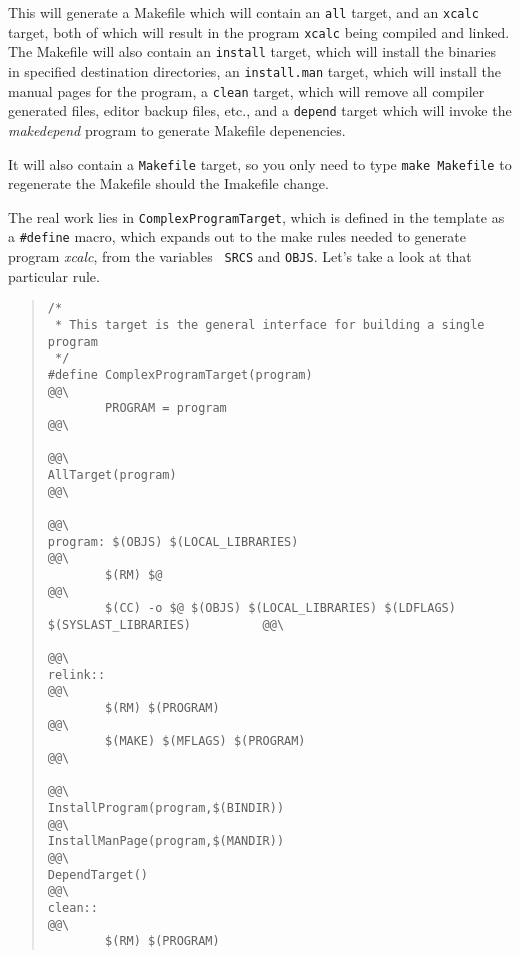 This will generate a Makefile which will contain an {\tt all} target,
and an {\tt xcalc} target, both of which will result in the program
{\tt xcalc} being compiled and linked. The Makefile will also contain
an {\tt install} target, which will install the binaries in specified
destination directories, an {\tt install.man} target, which will
install the manual pages for the program, a {\tt clean} target, which
will remove all compiler generated files, editor backup files, etc.,
and a {\tt depend} target which will invoke the {\em makedepend}
program to generate Makefile depenencies.

It will also contain a {\tt Makefile} target, so you only need to type
{\tt make Makefile} to regenerate the Makefile should the Imakefile
change.

The real work lies in {\tt ComplexProgramTarget}, which is defined in
the template as a {\tt \#define} macro, which expands out to the make
rules needed to generate program {\em xcalc}, from the variables {\tt
SRCS} and {\tt OBJS}. Let's take a look at that particular rule.

\begin{quote}
\begin{verbatim}
/*
 * This target is the general interface for building a single program
 */
#define ComplexProgramTarget(program)                                   @@\
        PROGRAM = program                                               @@\
                                                                        @@\
AllTarget(program)                                                      @@\
                                                                        @@\
program: $(OBJS) $(LOCAL_LIBRARIES)                                     @@\
        $(RM) $@                                                        @@\
        $(CC) -o $@ $(OBJS) $(LOCAL_LIBRARIES) $(LDFLAGS) $(SYSLAST_LIBRARIES)          @@\
                                                                        @@\
relink::                                                                @@\
        $(RM) $(PROGRAM)                                                @@\
        $(MAKE) $(MFLAGS) $(PROGRAM)                                    @@\
                                                                        @@\
InstallProgram(program,$(BINDIR))                                       @@\
InstallManPage(program,$(MANDIR))                                       @@\
DependTarget()                                                          @@\
clean::                                                                 @@\
        $(RM) $(PROGRAM)
\end{verbatim}
\end{quote}

